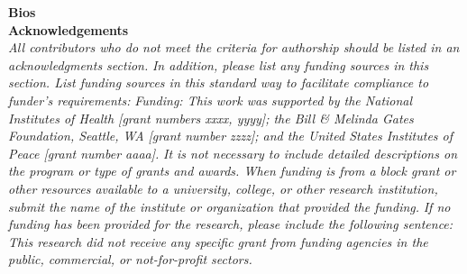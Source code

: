 \documentclass[11pt, letterpaper]{article}
\begin{document}
\noindent
\textbf{Bios}\\


\noindent
\textbf{Acknowledgements}\\





\noindent
\textit{All contributors who do not meet the criteria for authorship should be listed in an acknowledgments section.} 
\vskip 0.2cm
\noindent
\textit{In addition, please list any funding sources in this section. List funding sources in this standard way to facilitate compliance to funder's requirements:}
\vskip 0.2cm
\noindent
\textit{Funding: This work was supported by the National Institutes of Health [grant numbers xxxx, yyyy]; the Bill \& Melinda Gates Foundation, Seattle, WA [grant number zzzz]; and the United States Institutes of Peace [grant number aaaa].}
\vskip 0.2cm
\noindent
\textit{It is not necessary to include detailed descriptions on the program or type of grants and awards. When funding is from a block grant or other resources available to a university, college, or other research institution, submit the name of the institute or organization that provided the funding.}
\vskip 0.2cm
\noindent
\textit{If no funding has been provided for the research, please include the following sentence:}
\vskip 0.2cm
\noindent
\textit{This research did not receive any specific grant from funding agencies in the public, commercial, or not-for-profit sectors.
}\\


%
%


\end{document}
